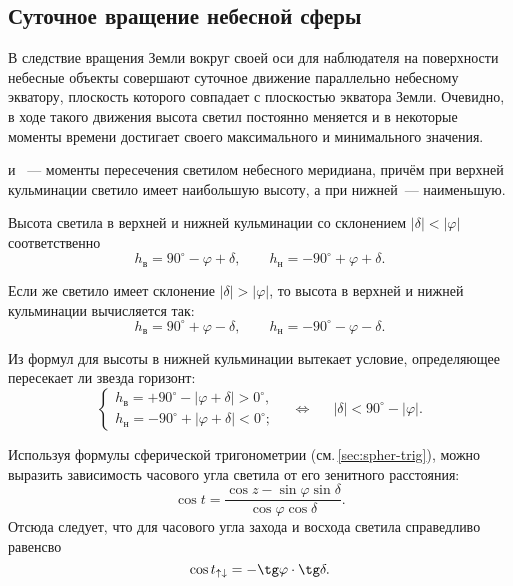 \subsection{Суточное вращение небесной сферы}
В следствие вращения Земли вокруг своей оси для наблюдателя на поверхности небесные объекты совершают суточное движение параллельно небесному экватору, плоскость которого совпадает с плоскостью экватора Земли. Очевидно, в ходе такого движения высота светил постоянно меняется и в некоторые моменты времени достигает своего максимального и минимального значения. 

 и ~--- моменты пересечения светилом небесного меридиана, причём при верхней кульминации светило имеет наибольшую высоту, а при нижней~--- наименьшую.

Высота светила в верхней и нижней кульминации со склонением $|\delta| < |\varphi|$ соответственно
\begin{equation}
h_{\text{в}}= 90^\circ - \varphi + \delta, \quad\quad
h_{\text{н}}= - 90^\circ + \varphi  + \delta.
\end{equation}

Если же светило имеет склонение $|\delta| > |\varphi|$, то высота в верхней и нижней кульминации вычисляется так:
\begin{equation}
h_{\text{в}}= 90^\circ + \varphi - \delta, \quad\quad
h_{\text{н}}= - 90^\circ -\varphi - \delta.
\end{equation}

Из формул для высоты в нижней кульминации вытекает условие, определяющее пересекает ли звезда горизонт:
\begin{equation}
\begin{cases}
	h_\text{в}= +90^\circ - |\varphi + \delta| > 0^\circ,\\
	h_\text{н} = - 90^\circ + |\varphi + \delta| < 0^\circ;	
\end{cases}
\quad \Longleftrightarrow \quad~~ |\delta|< 90^{\circ} - |\varphi|.
\end{equation}

Используя формулы сферической тригонометрии (см.\,\ref{sec:spher-trig}), можно выразить зависимость часового угла светила от его зенитного расстояния:
\begin{equation}
\cos t=\frac{\cos z-\sin\varphi\sin\delta}{\cos\varphi\cos\delta}. 
\end{equation}
Отсюда следует, что для часового угла захода и восхода светила справедливо равенсво
\begin{equation}
	\cos t_{\uparrow\downarrow}=-\tg\varphi\cdot\tg\delta.
\end{equation} 

